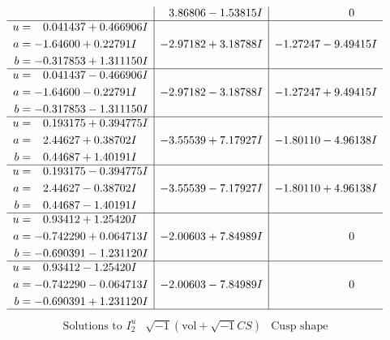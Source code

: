 \documentclass[1p]{elsarticle_modified}
\theoremstyle{definition}
\newcommand{\I}{\sqrt{-1}}
\begin{document}
$$\begin{array}{c|c|c}
 & \phantom{-}3.86806 - 1.53815 I & \phantom{-0.000000 } 0 \\ \hline\begin{aligned}
u &= \phantom{-}0.041437 + 0.466906 I \\
a &= -1.64600 + 0.22791 I \\
b &= -0.317853 + 1.311150 I\end{aligned}
 & -2.97182 + 3.18788 I & -1.27247 - 9.49415 I \\ \hline\begin{aligned}
u &= \phantom{-}0.041437 - 0.466906 I \\
a &= -1.64600 - 0.22791 I \\
b &= -0.317853 - 1.311150 I\end{aligned}
 & -2.97182 - 3.18788 I & -1.27247 + 9.49415 I \\ \hline\begin{aligned}
u &= \phantom{-}0.193175 + 0.394775 I \\
a &= \phantom{-}2.44627 + 0.38702 I \\
b &= \phantom{-}0.44687 + 1.40191 I\end{aligned}
 & -3.55539 + 7.17927 I & -1.80110 - 4.96138 I \\ \hline\begin{aligned}
u &= \phantom{-}0.193175 - 0.394775 I \\
a &= \phantom{-}2.44627 - 0.38702 I \\
b &= \phantom{-}0.44687 - 1.40191 I\end{aligned}
 & -3.55539 - 7.17927 I & -1.80110 + 4.96138 I \\ \hline\begin{aligned}
u &= \phantom{-}0.93412 + 1.25420 I \\
a &= -0.742290 + 0.064713 I \\
b &= -0.690391 - 1.231120 I\end{aligned}
 & -2.00603 + 7.84989 I & \phantom{-0.000000 } 0 \\ \hline\begin{aligned}
u &= \phantom{-}0.93412 - 1.25420 I \\
a &= -0.742290 - 0.064713 I \\
b &= -0.690391 + 1.231120 I\end{aligned}
 & -2.00603 - 7.84989 I & \phantom{-0.000000 } 0\\
 \hline 
 \end{array}$$\newpage$$\begin{array}{c|c|c}  
\text{Solutions to }I^u_{2}& \I (\text{vol} + \sqrt{-1}CS) & \text{Cusp shape}\\

\end{array}$$
\end{document}
